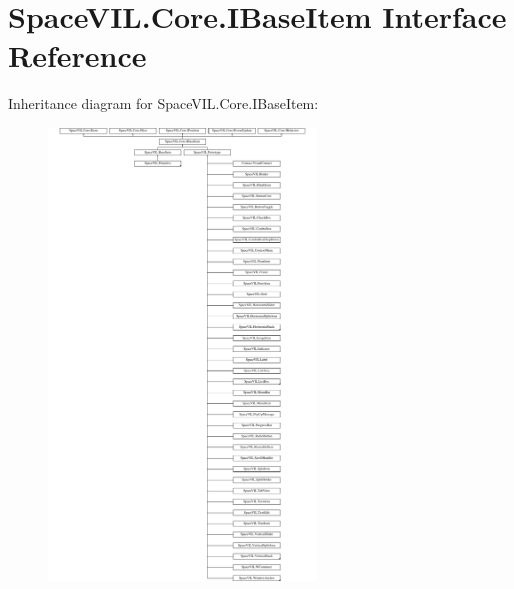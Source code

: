 \hypertarget{interface_space_v_i_l_1_1_core_1_1_i_base_item}{}\section{Space\+V\+I\+L.\+Core.\+I\+Base\+Item Interface Reference}
\label{interface_space_v_i_l_1_1_core_1_1_i_base_item}
Inheritance diagram for Space\+V\+I\+L.\+Core.\+I\+Base\+Item\+:\begin{figure}[H]
\begin{center}
\leavevmode
\includegraphics[height=12.000000cm]{interface_space_v_i_l_1_1_core_1_1_i_base_item}
\end{center}
\end{figure}
